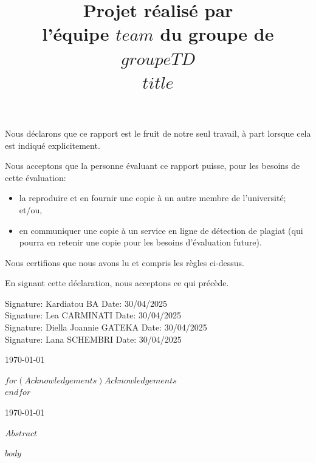 \documentclass[mstat,12pt]{unswthesis}
\title{Projet réalisé par\\[0.5cm] l'équipe $team$ du groupe de $groupeTD$ \\[3cm]$title$}
\author{\Authornameonly}
\begin{document}
\beforepreface




\vskip 2pc \noindent Nous déclarons que ce rapport est le fruit de notre seul travail, à part lorsque cela est indiqué  explicitement. 

\vskip 2pc  \noindent Nous acceptons que la personne évaluant ce rapport puisse, pour les besoins de cette évaluation:
\begin{itemize}
\item la reproduire et en fournir une copie à un autre membre de l'université; et/ou,
\item en communiquer une copie à un service en ligne de détection de plagiat (qui pourra en retenir une copie pour les besoins d'évaluation future).
\end{itemize}

\vskip 2pc \noindent Nous certifions que nous avons lu et compris les règles ci-dessus.\vspace{24pt}

\vskip 2pc \noindent En signant cette déclaration, nous acceptons ce qui précède.
\vskip 2pc \noindent

Signature: Kardiatou BA \hfill Date: 30/04/2025\\[0.5cm]
Signature: Lea CARMINATI \hfill Date: 30/04/2025 \\[0.5cm]
Signature: Diella Joannie GATEKA \hfill Date: 30/04/2025 \\[0.5cm]
Signature: Lana SCHEMBRI \hfill Date: 30/04/2025 \\[0.5cm]

\vskip 1pc


{\bigskip\bigskip\bigskip\noindent} \today




{\bigskip}$for(Acknowledgements)$$Acknowledgements$\\[1cm] $endfor$

{\bigskip\bigskip\bigskip\noindent} \today




$Abstract$



\afterpreface





%
%






$body$
\end{document}
